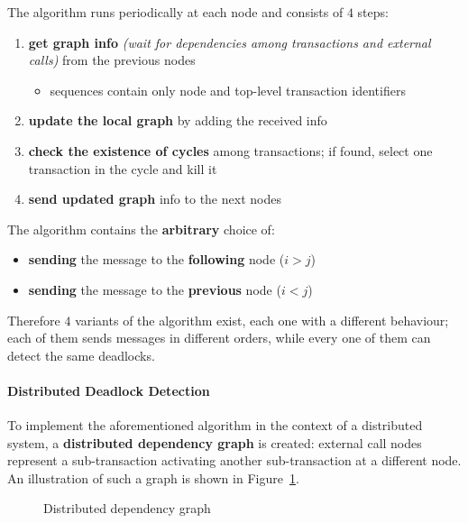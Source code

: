 \documentclass[english]{article}
\begin{document}
\bigskip
The algorithm runs periodically at each node and consists of \(4\) steps:

\begin{enumerate}
  \item \textbf{get graph info} \textit{(wait for dependencies among transactions and external calls)} from the previous nodes
        \begin{itemize}[label=\(\rightarrow\)]
          \item sequences contain only node and top-level transaction identifiers
        \end{itemize}
  \item \textbf{update the local graph} by adding the received info
  \item \textbf{check the existence of cycles} among transactions; if found, select one transaction in the cycle and kill it
  \item \textbf{send updated graph} info to the next nodes
\end{enumerate}

The algorithm contains the \textbf{arbitrary} choice of:

\begin{itemize}
  \item \textbf{sending} the message to the \textbf{following} node (\(i > j\))
  \item \textbf{sending} the message to the \textbf{previous} node (\(i < j\))
\end{itemize}
Therefore \(4\) variants of the algorithm exist, each one with a different behaviour;
each of them sends messages in different orders, while every one of them can detect the same deadlocks.

\paragraph{Distributed Deadlock Detection}

To implement the aforementioned algorithm in the context of a distributed system, a \textbf{distributed dependency graph} is created:
external call nodes represent a sub-transaction activating another sub-transaction at a different node.
An illustration of such a graph is shown in Figure~\ref{fig:distributed-dep-graph}.

\begin{figure}[htbp]
  \centering
  \bigskip
  \caption{Distributed dependency graph}
  \label{fig:distributed-dep-graph}
  \bigskip
\end{figure}
\end{document}

